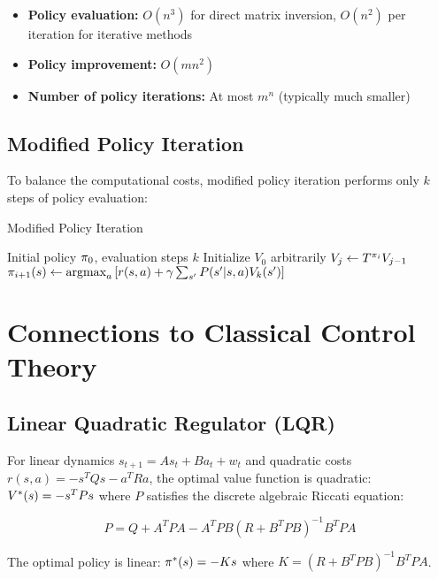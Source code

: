 \begin{itemize}
    \item \textbf{Policy evaluation:} $O(n^3)$ for direct matrix inversion, $O(n^2)$ per iteration for iterative methods
    \item \textbf{Policy improvement:} $O(mn^2)$
    \item \textbf{Number of policy iterations:} At most $m^n$ (typically much smaller)
\end{itemize}

\subsection{Modified Policy Iteration}

To balance the computational costs, modified policy iteration performs only $k$ steps of policy evaluation:

\begin{algorithm}
\caption{Modified Policy Iteration}
\begin{algorithmic}
\REQUIRE Initial policy $\pi_0$, evaluation steps $k$
\STATE Initialize $V_0$ arbitrarily
        \STATE $V_j \leftarrow T^{\pi_i} V_{j-1}$
    \ENDFOR
    \STATE $\pi_{i+1}(s) \leftarrow \operatorname*{argmax}_a \left[r(s,a) + \gamma \sum_{s'} P(s'|s,a) V_k(s')\right]$
\ENDFOR
\end{algorithmic}
\end{algorithm}

\section{Connections to Classical Control Theory}

\subsection{Linear Quadratic Regulator (LQR)}

For linear dynamics $s_{t+1} = As_t + Ba_t + w_t$ and quadratic costs $r(s,a) = -s^TQs - a^TRa$, the optimal value function is quadratic: $V^*(s) = -s^TPs$ where $P$ satisfies the discrete algebraic Riccati equation:

\begin{equation}
P = Q + A^TPA - A^TPB(R + B^TPB)^{-1}B^TPA
\end{equation}

The optimal policy is linear: $\pi^*(s) = -Ks$ where $K = (R + B^TPB)^{-1}B^TPA$.

